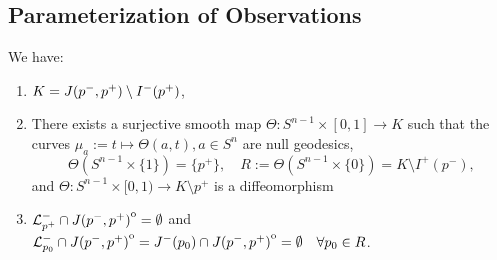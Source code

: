 \subsection{Parameterization of Observations}
\begin{lemma}\label{lem:Kcharact}
    We have:
    \begin{enumerate}[label={\textnormal{(\arabic*)}}]
        \item $K=J(p^-,p^+)\setminus I^-(p^+)$,
        \item There exists a surjective smooth map $\Theta:S^{n-1}\times[0,1] \to K$ such that the curves $\mu_a:=t\mapsto\Theta(a,t), a\in S^n$ are null geodesics, 
        \[\Theta(S^{n-1}\times\{1\}) = \{p^+\}, \quad R:=\Theta(S^{n-1}\times\{0\}) = K \setminus I^+(p^-),\] and
        $\Theta:S^{n-1}\times[0,1)\to K\setminus p^+$ is a diffeomorphism
        \item ${\mathcal{L}}^-_{p^+}\cap {\kern0ptJ(p^-,p^+)}^{\mathrm{o}} = \emptyset$ and\\ ${\mathcal{L}}^-_{p_0} \cap {\kern0ptJ(p^-,p^+)}^{\mathrm{o}} = J^-(p_0) \cap {\kern0ptJ(p^-,p^+)}^{\mathrm{o}} = \emptyset \quad \forall p_0\in R$.
    \end{enumerate}
\end{lemma}
